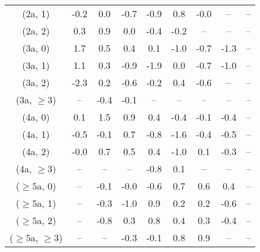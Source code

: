 \begin{table}[h!]
{\begin{tabular}{ccccccccc}
	(2a, 1) & -0.2 & 0.0 & -0.7 & -0.9 & 0.8 & -0.0 & -- & -- \\[0.5ex] 
	(2a, 2) & 0.3 & 0.9 & 0.0 & -0.4 & -0.2 & -- & -- & -- \\[0.5ex] 
	(3a, 0) & 1.7 & 0.5 & 0.4 & 0.1 & -1.0 & -0.7 & -1.3 & -- \\[0.5ex] 
	(3a, 1) & 1.1 & 0.3 & -0.9 & -1.9 & 0.0 & -0.7 & -1.0 & -- \\[0.5ex] 
	(3a, 2) & -2.3 & 0.2 & -0.6 & -0.2 & 0.4 & -0.6 & -- & -- \\[0.5ex] 
	(3a, $\ge3$) & -- & -0.4 & -0.1 & -- & -- & -- & -- & -- \\[0.5ex] 
	(4a, 0) & 0.1 & 1.5 & 0.9 & 0.4 & -0.4 & -0.1 & -0.4 & -- \\[0.5ex] 
	(4a, 1) & -0.5 & -0.1 & 0.7 & -0.8 & -1.6 & -0.4 & -0.5 & -- \\[0.5ex] 
	(4a, 2) & -0.0 & 0.7 & 0.5 & 0.4 & -1.0 & 0.1 & -0.3 & -- \\[0.5ex] 
	(4a, $\ge3$) & -- & -- & -- & -0.8 & 0.1 & -- & -- & -- \\[0.5ex] 
	($\ge5$a, 0) & -- & -0.1 & -0.0 & -0.6 & 0.7 & 0.6 & 0.4 & -- \\[0.5ex] 
	($\ge5$a, 1) & -- & -0.3 & -1.0 & 0.9 & 0.2 & 0.2 & -0.6 & -- \\[0.5ex] 
	($\ge5$a, 2) & -- & -0.8 & 0.3 & 0.8 & 0.4 & 0.3 & -0.4 & -- \\[0.5ex] 
	($\ge5$a, $\ge3$) & -- & -- & -0.3 & -0.1 & 0.8 & 0.9 & -- & -- \\[0.5ex] 
	\hline
	\hline
\end{tabular}}
\end{table}
